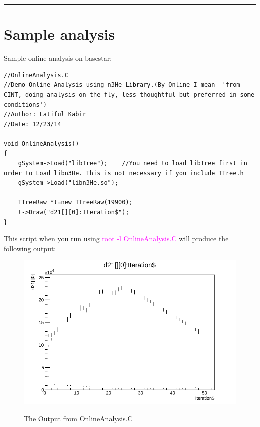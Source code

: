 \documentclass[12pt]{article}
\begin{document}
\noindent
{\color{red} \rule{\linewidth}{1mm} }
 
\newpage
\section{Sample analysis}
Sample online analysis on basestar:
\begin{lstlisting}
//OnlineAnalysis.C
//Demo Online Analysis using n3He Library.(By Online I mean  'from CINT, doing analysis on the fly, less thoughtful but preferred in some conditions')
//Author: Latiful Kabir
//Date: 12/23/14

void OnlineAnalysis()
{
    gSystem->Load("libTree");    //You need to load libTree first in order to Load libn3He. This is not necessary if you include TTree.h
    gSystem->Load("libn3He.so");

    TTreeRaw *t=new TTreeRaw(19900);
    t->Draw("d21[][0]:Iteration$");
}

\end{lstlisting}

This script when you run using \textcolor{magenta}{root -l OnlineAnalysis.C} will produce the following output:

\begin{figure}[htb]
\centering
\includegraphics[width=6in]{OnlineAnalysis.png}\\
\caption{The Output from OnlineAnalysis.C}\label{f5}
\end{figure}

\newpage
\end{document}
